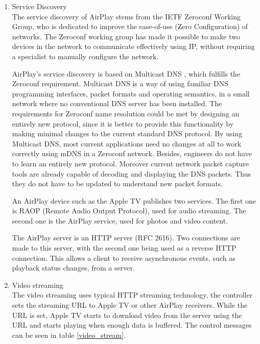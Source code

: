 \begin{enumerate} 
\item Service Discovery \\ 
The service discovery of AirPlay stems from the IETF Zeroconf Working Group, 
who is dedicated to improve the ease-of-use (Zero Configuration) of networks. The 
Zeroconf working group has made it possible to make two devices in the 
network to communicate effectively using IP, without requiring a specialist to manually 
configure the network. 

AirPlay's service discovery is based on Multicast DNS \cite{multicastdns}, which 
fulfills the Zeroconf requirement. Multicast DNS is a way of using familiar DNS 
programming interfaces, packet formats and operating semantics, in a small 
network where no conventional DNS server has been installed. The requirements 
for Zeroconf name resolution could be met by designing an entirely new 
protocol, since it is better to provide this functionality by making minimal changes 
to the current standard DNS protocol. By using Multicast DNS, most current 
applications need no changes at all to work correctly using mDNS in a Zeroconf network. Besides,
engineers do not have to learn an entirely new protocol. Moreover current network 
packet capture tools are already capable of  decoding and displaying the DNS packets. Thus they do not 
have to be updated to understand new packet formats. 

An AirPlay device such as the Apple TV publishes two services. The first one is 
RAOP (Remote Audio Output Protocol), used for audio streaming. The second 
one is the AirPlay service, used for photos and video content. 

The AirPlay server is an HTTP server (RFC 2616). Two connections are made to this 
server, with the second one being used as a reverse HTTP connection. This allows a 
client to receive asynchronous events, such as playback status changes, from a 
server. 
\item Video streaming \\ 
The video streaming uses typical HTTP streaming technology, the controller sets 
the streaming URL to Apple TV or other AirPlay receivers. While the URL is set, 
Apple TV starts to download video from the server using the URL and starts 
playing when enough data is buffered. The control messages can be seen in 
table \ref{video_stream}. 


\end{enumerate}
